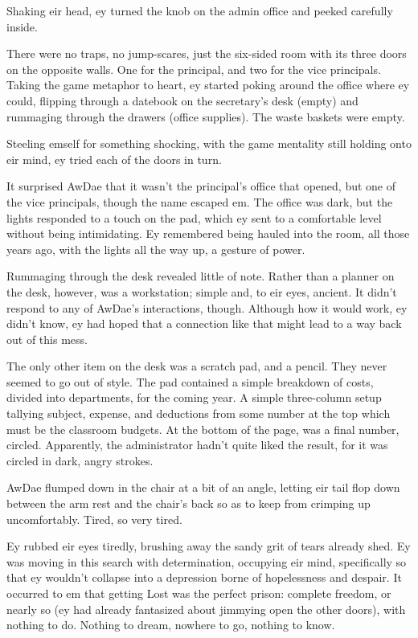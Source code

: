 Shaking eir head, ey turned the knob on the admin office and peeked carefully inside.

There were no traps, no jump-scares, just the six-sided room with its three doors on the opposite walls.  One for the principal, and two for the vice principals.  Taking the game metaphor to heart, ey started poking around the office where ey could, flipping through a datebook on the secretary's desk (empty) and rummaging through the drawers (office supplies).  The waste baskets were empty.

Steeling emself for something shocking, with the game mentality still holding onto eir mind, ey tried each of the doors in turn.

It surprised AwDae that it wasn't the principal's office that opened, but one of the vice principals, though the name escaped em.  The office was dark, but the lights responded to a touch on the pad, which ey sent to a comfortable level without being intimidating.  Ey remembered being hauled into the room, all those years ago, with the lights all the way up, a gesture of power.

Rummaging through the desk revealed little of note.  Rather than a planner on the desk, however, was a workstation; simple and, to eir eyes, ancient.  It didn't respond to any of AwDae's interactions, though.  Although how it would work, ey didn't know, ey had hoped that a connection like that might lead to a way back out of this mess.

The only other item on the desk was a scratch pad, and a pencil.  They never seemed to go out of style.  The pad contained a simple breakdown of costs, divided into departments, for the coming year.  A simple three-column setup tallying subject, expense, and deductions from some number at the top which must be the classroom budgets.  At the bottom of the page, was a final number, circled.  Apparently, the administrator hadn't quite liked the result, for it was circled in dark, angry strokes.

AwDae flumped down in the chair at a bit of an angle, letting eir tail flop down between the arm rest and the chair's back so as to keep from crimping up uncomfortably.  Tired, so very tired.

Ey rubbed eir eyes tiredly, brushing away the sandy grit of tears already shed.  Ey was moving in this search with determination, occupying eir mind, specifically so that ey wouldn't collapse into a depression borne of hopelessness and despair.  It occurred to em that getting Lost was the perfect prison: complete freedom, or nearly so (ey had already fantasized about jimmying open the other doors), with nothing to do.  Nothing to dream, nowhere to go, nothing to know.

